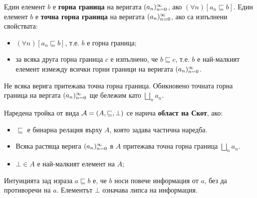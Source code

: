 Един елемент $b$ е {\bf горна граница} на веригата $(a_{n})^{\infty}_{n=0}$, ако 
$(\forall n)[a_n \sqsubseteq b]$.
Един елемент $b$ е {\bf точна горна граница} на веригата $(a_{n})^{\infty}_{n=0}$, ако са изпълнени свойствата:
\begin{itemize}
\item 
  $(\forall n)[a_n \sqsubseteq b]$, т.е. $b$ е горна граница;
\item
  за всяка друга горна граница $c$ е изпълнено, че $b \sqsubseteq c$, т.е.
  $b$ е най-малкият елемент измежду всички горни граници на веригата $(a_{n})^{\infty}_{n=0}$.
\end{itemize}
Не всяка верига притежава точна горна граница.
Обикновено точната горна граница на вергата $(a_{n})^{\infty}_{n=0}$ ще бележим като $\bigsqcup_n a_n$.




\begin{framed}
  \begin{definition}
    Наредена тройка от вида $\mathcal{A} = (A, \sqsubseteq, \bot)$ се нарича {\bf област на Скот}, ако:
    \begin{itemize}
    \item
      $\sqsubseteq$ е бинарна релация върху $A$, която задава частична наредба.
    \item
      Всяка растяща верига $(a_{n})^{\infty}_{n=0}$ в $A$ притежава точна горна граница $\bigsqcup_n a_n$.
    \item
      $\bot \in A$ е най-малкият елемент на $A$;
    \end{itemize}
  \end{definition}
\end{framed}


Интуицията зад израза $a \sqsubseteq b$ е, че $b$ носи повече информация от $a$, без да противоречи на $a$. Елементът $\bot$ означава липса на информация.


